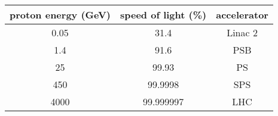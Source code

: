 \begin{tabular}{c|c|c}
  proton energy (GeV) & speed of light (\%) & accelerator \\
  \hline
     0.05             & 31.4                & Linac 2     \\
     1.4              & 91.6                & PSB         \\
    25                & 99.93               & PS          \\
   450                & 99.9998             & SPS         \\
  4000                & 99.999997           & LHC         \\
\end{tabular}

